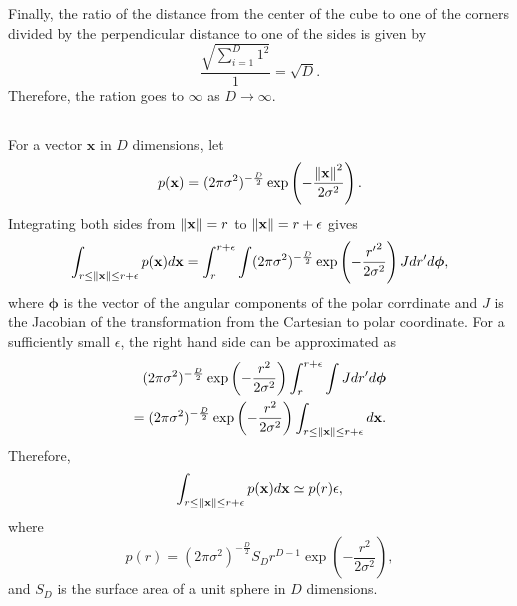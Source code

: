 Finally, the ratio of the distance from the center of the cube to one of the corners divided by the perpendicular distance to one of the sides is given by
%
\begin{equation}
\frac{\sqrt{\sum_{i = 1}^{D} 1 ^ 2}}{1} = \sqrt{D}.
\end{equation}
%
Therefore, the ration goes to $\infty$ as $D \to \infty$.


\subsection{}
For a vector $\mathbf{x}$ in $D$ dimensions, let 
%
\begin{equation}
p(\mathbf{x}) = (2 \pi \sigma ^ 2) ^ {- \frac{D}{2}} \exp \left( - \frac{\norm{\mathbf{x}} ^ 2}{2 \sigma ^2} \right).
\end{equation}
%
Integrating both sides from $\norm{\mathbf{x}} = r$ to $\norm{\mathbf{x}} = r + \epsilon$ gives
%
\begin{equation}
\int_{r \leq \norm{\mathbf{x}} \leq r + \epsilon} p(\mathbf{x}) d\mathbf{x} = \int_{r}^{r + \epsilon} \int (2 \pi \sigma ^ 2) ^ {- \frac{D}{2}} \exp \left( - \frac{{r'} ^ 2}{2 \sigma ^2} \right) J dr' d\bm{\phi},
\end{equation}
%
where $\bm{\phi}$ is the vector of the angular components of the polar corrdinate and $J$ is the Jacobian of the transformation from the Cartesian to polar coordinate.
For a sufficiently small $\epsilon$, the right hand side can be approximated as
%
\begin{equation}
\begin{aligned}
(2 \pi \sigma ^ 2) ^ {- \frac{D}{2}} \exp \left( - \frac{r ^ 2}{2 \sigma ^2} \right) \int_{r}^{r + \epsilon} \int J dr' d\bm{\phi} \\
= (2 \pi \sigma ^ 2) ^ {- \frac{D}{2}} \exp \left( - \frac{r ^ 2}{2 \sigma ^2} \right) \int_{r \leq \norm{\mathbf{x}} \leq r + \epsilon} d\mathbf{x}.
\end{aligned}
\end{equation}
%
Therefore,
%
\begin{equation}
\int_{r \leq \norm{\mathbf{x}} \leq r + \epsilon} p(\mathbf{x}) d\mathbf{x} \simeq p(r) \epsilon,
\end{equation}
%
where
%
\begin{equation}
p(r) = (2 \pi \sigma ^ 2) ^ {- \frac{D}{2}} S_D r ^ {D - 1} \exp \left( - \frac{r ^ 2}{2 \sigma ^2} \right),
\end{equation}
%
and $S_D$ is the surface area of a unit sphere in $D$ dimensions.

